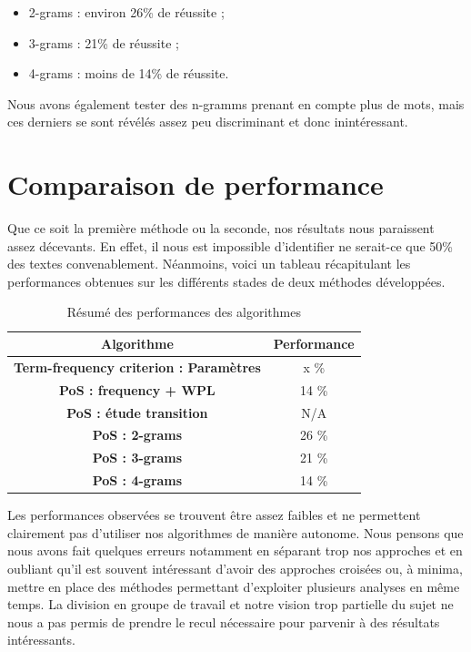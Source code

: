 \documentclass[a4paper,12pt]{report}
\begin{document}
\begin{itemize}
\item{2-grams : environ 26\% de réussite ;}
\item{3-grams : 21\% de réussite ;}
\item{4-grams : moins de 14\% de réussite.}
\end{itemize}

Nous avons également tester des n-gramms prenant en compte plus de mots, mais ces derniers se sont révélés assez peu discriminant et donc inintéressant.



\section{Comparaison de performance}

Que ce soit la première méthode ou la seconde, nos résultats nous paraissent assez décevants. En effet, il nous est impossible d'identifier ne serait-ce que 50\% des textes convenablement. Néanmoins, voici un tableau récapitulant les performances obtenues sur les différents stades de deux méthodes développées.

\begin{table}[H]
\centering
\begin{tabular}{|c|c|}
\hline \textbf{Algorithme} & \textbf{Performance} \\ 
\hline 
\textbf{Term-frequency criterion : Paramètres} & x \%  \\ 
\hline 
\textbf{PoS : frequency + WPL} & 14 \% \\ 
\hline 
\textbf{PoS : étude transition} & N/A \\ 
\hline 
\textbf{PoS : 2-grams} & 26 \% \\ 
\hline 
\textbf{PoS : 3-grams} & 21 \% \\ 
\hline 
\textbf{PoS : 4-grams} & 14 \% \\ 
\hline 
\end{tabular} 
\caption{Résumé des performances des algorithmes}
\end{table}

Les performances observées se trouvent être assez faibles et ne permettent clairement pas d'utiliser nos algorithmes de manière autonome. Nous pensons que nous avons fait quelques erreurs notamment en séparant trop nos approches et en oubliant qu'il est souvent intéressant d'avoir des approches croisées ou, à minima, mettre en place des méthodes permettant d'exploiter plusieurs analyses en même temps. La division en groupe de travail et notre vision trop partielle du sujet ne nous a pas permis de prendre le recul nécessaire pour parvenir à des résultats intéressants.
\end{document}

